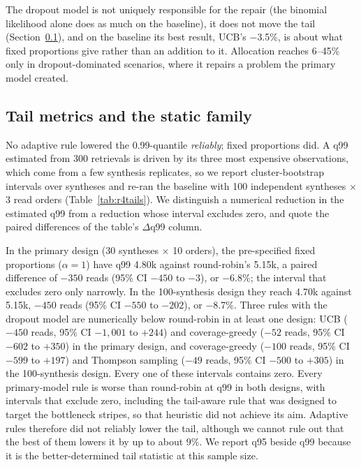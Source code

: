 \documentclass[conference,onecolumn,11pt]{IEEEtran}
\begin{document}
The dropout model is not uniquely responsible for the repair (the binomial likelihood alone does as much
on the baseline), it does not move the tail (Section~\ref{sec:res-tail}), and on the baseline its best
result, UCB's $-$3.5\%, is about what fixed proportions give rather than an addition to it.  Allocation
reaches 6--45\% only in dropout-dominated scenarios, where it repairs a problem the primary model created.

\subsection{Tail metrics and the static family}\label{sec:res-tail}

No adaptive rule lowered the 0.99-quantile \emph{reliably}; fixed proportions did.  A q99 estimated from
300 retrievals is driven by its three most expensive observations, which come from a few synthesis
replicates, so we report cluster-bootstrap intervals over syntheses and re-ran the baseline with 100
independent syntheses $\times$ 3 read orders (Table~\ref{tab:r4tails}).  We distinguish a numerical
reduction in the estimated q99 from a reduction whose interval excludes zero, and quote the paired
differences of the table's $\Delta$q99 column.

In the primary design (30 syntheses $\times$ 10 orders), the pre-specified fixed proportions
($\alpha{=}1$) have q99 4.80k against round-robin's 5.15k, a paired difference of $-350$ reads (95\% CI $-450$ to $-3$),
or $-$6.8\%; the interval that excludes zero only narrowly.  In the 100-synthesis design they
reach 4.70k against 5.15k, $-450$ reads (95\% CI $-550$ to $-202$), or $-$8.7\%.  Three rules with the dropout model
are numerically below round-robin in at least one design: UCB ($-450$ reads, 95\% CI $-1{,}001$ to $+244$) and coverage-greedy
($-52$ reads, 95\% CI $-602$ to $+350$) in the primary design, and coverage-greedy ($-100$ reads, 95\% CI $-599$ to $+197$) and Thompson sampling
($-49$ reads, 95\% CI $-500$ to $+305$) in the 100-synthesis design.  Every one of these intervals contains zero.  Every
primary-model rule is worse than round-robin at q99 in both designs, with intervals that exclude zero,
including the tail-aware rule that was designed to target the bottleneck stripes, so that heuristic did
not achieve its aim.  Adaptive rules therefore did not reliably lower the tail, although we cannot rule
out that the best of them lowers it by up to about 9\%.  We report q95 beside q99 because it is the
better-determined tail statistic at this sample size.
\end{document}
